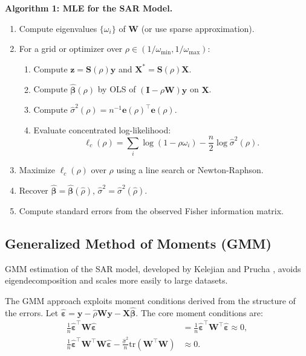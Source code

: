 \documentclass[conference]{IEEEtran}
\theoremstyle{definition}
\begin{document}
\textbf{Algorithm 1: MLE for the SAR Model.}
\begin{enumerate}
\item Compute eigenvalues $\{\omega_i\}$ of $\mathbf{W}$ (or use sparse approximation).
\item For a grid or optimizer over $\rho \in (1/\omega_{\min}, 1/\omega_{\max})$:
    \begin{enumerate}
    \item Compute $\mathbf{z} = \mathbf{S}(\rho)\mathbf{y}$ and $\mathbf{X}^* = \mathbf{S}(\rho)\mathbf{X}$. \quad [But note: for the concentrated likelihood, use $\mathbf{e}^0 = \mathbf{y} - \hat{\mathbf{y}}_{\text{OLS}}$ and $\mathbf{e}^{L} = \mathbf{W}\mathbf{y} - \widehat{\mathbf{W}\mathbf{y}}_{\text{OLS}}$.]
    \item Compute $\hat{\bm{\beta}}(\rho)$ by OLS of $(\mathbf{I}-\rho\mathbf{W})\mathbf{y}$ on $\mathbf{X}$.
    \item Compute $\hat{\sigma}^2(\rho) = n^{-1}\bm{e}(\rho)^\top\bm{e}(\rho)$.
    \item Evaluate concentrated log-likelihood:
    \begin{equation}
    \ell_c(\rho) = \sum_i \log(1-\rho\omega_i) - \frac{n}{2}\log\hat{\sigma}^2(\rho).
    \end{equation}
    \end{enumerate}
\item Maximize $\ell_c(\rho)$ over $\rho$ using a line search or Newton-Raphson.
\item Recover $\hat{\bm{\beta}} = \hat{\bm{\beta}}(\hat{\rho})$, $\hat{\sigma}^2 = \hat{\sigma}^2(\hat{\rho})$.
\item Compute standard errors from the observed Fisher information matrix.
\end{enumerate}

\subsection{Generalized Method of Moments (GMM)}

GMM estimation of the SAR model, developed by Kelejian and Prucha \cite{kelejian1999generalized,kelejian2010specification}, avoids eigendecomposition and scales more easily to large datasets.

The GMM approach exploits moment conditions derived from the structure of the errors. Let $\hat{\bm{\varepsilon}} = \mathbf{y} - \hat{\rho}\mathbf{W}\mathbf{y} - \mathbf{X}\hat{\bm{\beta}}$. The core moment conditions are:
\begin{align}
\frac{1}{n}\hat{\bm{\varepsilon}}^\top \mathbf{W}\hat{\bm{\varepsilon}} &= \frac{1}{n}\hat{\bm{\varepsilon}}^\top \mathbf{W}^\top\hat{\bm{\varepsilon}} \approx 0, \label{eq:gmm1}\\
\frac{1}{n}\hat{\bm{\varepsilon}}^\top \mathbf{W}^\top\mathbf{W}\hat{\bm{\varepsilon}} - \frac{\hat{\sigma}^2}{n}\mathrm{tr}(\mathbf{W}^\top\mathbf{W}) &\approx 0. \label{eq:gmm2}
\end{align}
\end{document}
